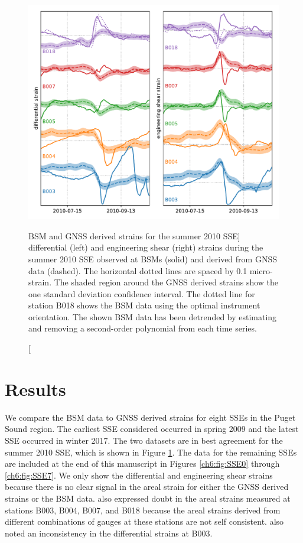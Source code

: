 \begin{figure}
\includegraphics{ch6/figures/SSE1.pdf}
\caption
[BSM and GNSS derived strains for the summer 2010 SSE]
{differential (left) and engineering shear (right) strains
during the summer 2010 SSE observed at BSMs (solid) and derived from
GNSS data (dashed). The horizontal dotted lines are spaced by 0.1
micro-strain. The shaded region around the GNSS derived strains show
the one standard deviation confidence interval. The dotted line for
station B018 shows the BSM data using the optimal instrument
orientation. The shown BSM data has been detrended by estimating and
removing a second-order polynomial from each time series.}
\label{ch6:fig:SSE1}
\end{figure}

\section{Results}
We compare the BSM data to GNSS derived strains for eight SSEs in the
Puget Sound region. The earliest SSE considered occurred in spring
2009 and the latest SSE occurred in winter 2017. The two datasets are
in best agreement for the summer 2010 SSE, which is shown in Figure
\ref{ch6:fig:SSE1}. The data for the remaining SSEs are included at the
end of this manuscript in Figures \ref{ch6:fig:SSE0} through
\ref{ch6:fig:SSE7}. We only show the differential and engineering shear
strains because there is no clear signal in the areal strain for
either the GNSS derived strains or the BSM data. \citet{Roeloffs2010}
also expressed doubt in the areal strains measured at stations B003,
B004, B007, and B018 because the areal strains derived from different
combinations of gauges at these stations are not self consistent.
\citet{Roeloffs2010} also noted an inconsistency in the differential
strains at B003.

